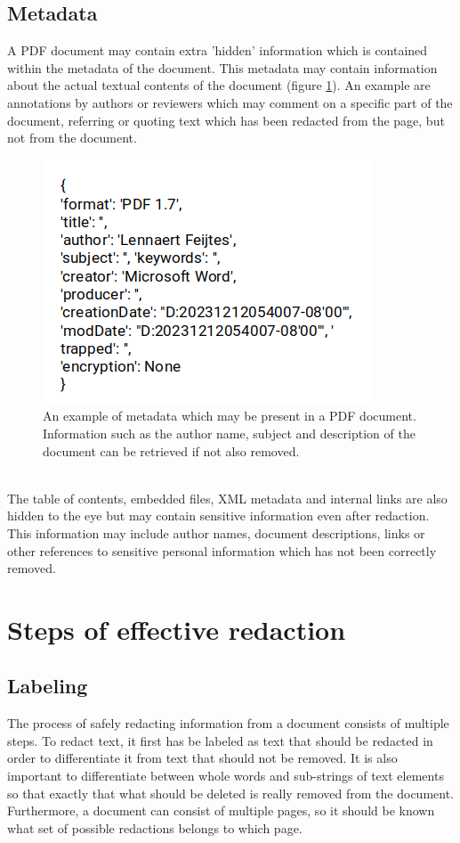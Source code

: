 \subsection{Metadata}
A PDF document may contain extra 'hidden' information which is contained within the metadata of the document. This metadata may contain information about the actual textual contents of the document (figure \ref{fig:metadataexmp}). An example are annotations by authors or reviewers which may comment on a specific part of the document, referring or quoting text which has been redacted from the page, but not from the document. 
\begin{figure}[h]
    \includegraphics[width=0.5\linewidth]{latex/media/metadata.png}
    \centering
    \caption{An example of metadata which may be present in a PDF document. Information such as the author name, subject and description of the document can be retrieved if not also removed.}
    \label{fig:metadataexmp}
\end{figure}\\
The table of contents, embedded files, XML metadata and internal links are also hidden to the eye but may contain sensitive information even after redaction. This information may include author names, document descriptions, links or other references to sensitive personal information which has not been correctly removed.

\section{Steps of effective redaction}
\subsection{Labeling}
The process of safely redacting information from a document consists of multiple steps. To redact text, it first has be labeled as text that should be redacted in order to differentiate it from text that should not be removed. It is also important to differentiate between whole words and sub-strings of text elements so that exactly that what should be deleted is really removed from the document. Furthermore, a document can consist of multiple pages, so it should be known what set of possible redactions belongs to which page. 
